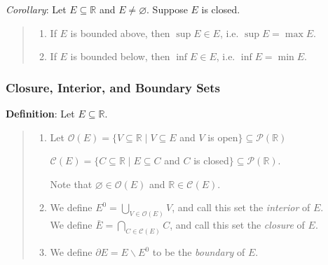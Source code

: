 \documentclass[11pt]{article}
\begin{document}
\emph{Corollary}: Let $E \subseteq \mathbb{R}$ and $E \neq \varnothing$. Suppose $E$ is closed.
\begin{quote}\vspace{-0.3cm}
	\begin{enumerate}
	\item If $E$ is bounded above, then $\sup E \in E$, i.e. $\sup E = \max E$.
	\item If $E$ is bounded below, then $\inf E \in E$, i.e. $\inf E = \min E$.
	\end{enumerate}
\end{quote}

\subsubsection{Closure, Interior, and Boundary Sets}

\textbf{Definition}: Let $E \subseteq \mathbb{R}$.
\begin{quote}\vspace{-0.3cm}
	\begin{enumerate}
	\item Let $\mathcal{O}(E) = \{V \subseteq \mathbb{R} \;|\; V \subseteq E$ and $V$ is open$\} \subseteq \mathcal{P}(\mathbb{R})$

	\hspace{0.75cm}$\mathcal{C}(E) = \{C \subseteq \mathbb{R} \;|\; E \subseteq C$ and $C$ is closed$\} \subseteq \mathcal{P}(\mathbb{R})$.

	Note that $\varnothing \in \mathcal{O}(E)$ and $\mathbb{R} \in \mathcal{C}(E)$.

	\item We define $E^0 = \bigcup_{V \in \mathcal{O}(E)} V$, and call this set the \emph{interior} of $E$.\\
	We define $\bar{E} = \bigcap_{C \in \mathcal{C}(E)} C$, and call this set the \emph{closure} of $E$.

	\item We define $\partial E = E \backslash E^0$ to be the \emph{boundary} of $E$.
	\end{enumerate}
\end{quote}
\end{document}
